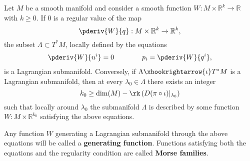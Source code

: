     \begin{theorem}\label{symplectic:maslow_hormander}
        Let $M$ be a smooth manifold and consider a smooth function $W:M\times\mathbb{R}^k\rightarrow\mathbb{R}$ with $k\geq 0$. If 0 is a regular value of the map \[\pderiv{W}{q}:M\times\mathbb{R}^k\rightarrow\mathbb{R}^k,\] the subset $\Lambda\subset T^*M$, locally defined by the equations
        \begin{gather}
            \pderiv{W}{u^i} = 0 \qquad\qquad p_i=\pderiv{W}{q^i},
        \end{gather}
        is a Lagrangian submanifold. Conversely, if $\Lambda\xhookrightarrow{\iota}T^*M$ is a Lagrangian submanifold, then at every $\lambda_0\in\Lambda$ there exists an integer \[k_0\geq\dim(M) - \rk\left(D(\pi\circ\iota)|_{\lambda_0}\right)\] such that locally around $\lambda_0$ the submanifold $\Lambda$ is described by some function $W:M\times\mathbb{R}^{k_0}$ satisfying the above equations.
    \end{theorem}
    Any function $W$ generating a Lagrangian submanifold through the above equations will be called a \textbf{generating function}. Functions satisfying both the equations and the regularity condition are called \textbf{Morse families}.


